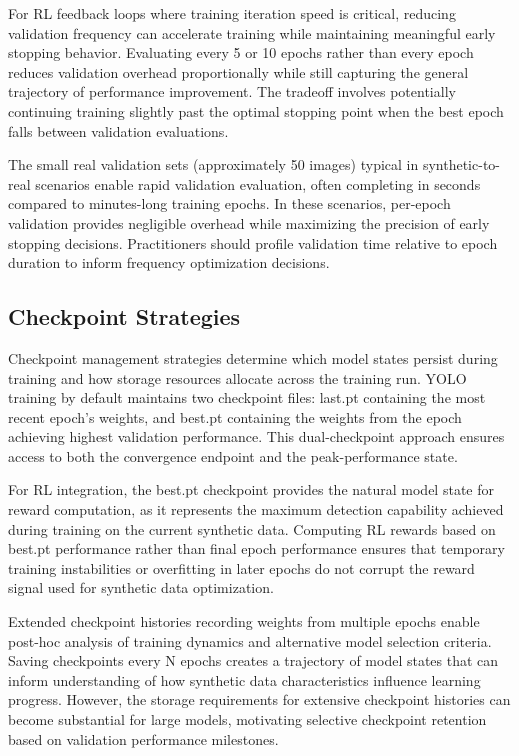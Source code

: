 For RL feedback loops where training iteration speed is critical, reducing validation frequency can accelerate training while maintaining meaningful early stopping behavior. Evaluating every 5 or 10 epochs rather than every epoch reduces validation overhead proportionally while still capturing the general trajectory of performance improvement. The tradeoff involves potentially continuing training slightly past the optimal stopping point when the best epoch falls between validation evaluations.

The small real validation sets (approximately 50 images) typical in synthetic-to-real scenarios enable rapid validation evaluation, often completing in seconds compared to minutes-long training epochs. In these scenarios, per-epoch validation provides negligible overhead while maximizing the precision of early stopping decisions. Practitioners should profile validation time relative to epoch duration to inform frequency optimization decisions.

\subsection{Checkpoint Strategies}

Checkpoint management strategies determine which model states persist during training and how storage resources allocate across the training run. YOLO training by default maintains two checkpoint files: last.pt containing the most recent epoch's weights, and best.pt containing the weights from the epoch achieving highest validation performance. This dual-checkpoint approach ensures access to both the convergence endpoint and the peak-performance state.

For RL integration, the best.pt checkpoint provides the natural model state for reward computation, as it represents the maximum detection capability achieved during training on the current synthetic data. Computing RL rewards based on best.pt performance rather than final epoch performance ensures that temporary training instabilities or overfitting in later epochs do not corrupt the reward signal used for synthetic data optimization.

Extended checkpoint histories recording weights from multiple epochs enable post-hoc analysis of training dynamics and alternative model selection criteria. Saving checkpoints every N epochs creates a trajectory of model states that can inform understanding of how synthetic data characteristics influence learning progress. However, the storage requirements for extensive checkpoint histories can become substantial for large models, motivating selective checkpoint retention based on validation performance milestones.

